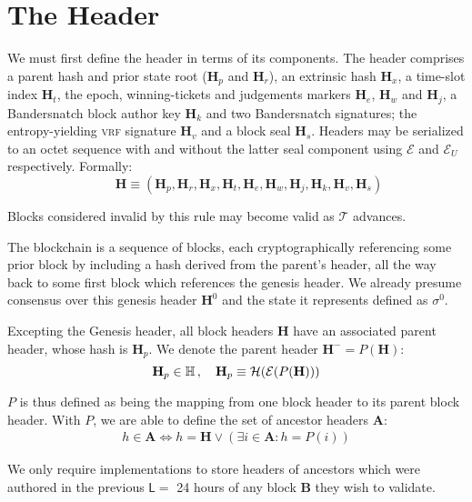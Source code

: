 \section{The Header}\label{sec:header}

We must first define the header in terms of its components. The header comprises a parent hash and prior state root ($\mathbf{H}_p$ and $\mathbf{H}_r$), an extrinsic hash $\mathbf{H}_x$, a time-slot index $\mathbf{H}_t$, the epoch, winning-tickets and judgements markers $\mathbf{H}_e$, $\mathbf{H}_w$ and $\mathbf{H}_j$, a Bandersnatch block author key $\mathbf{H}_k$ and two Bandersnatch signatures; the entropy-yielding \textsc{vrf} signature $\mathbf{H}_v$ and a block seal $\mathbf{H}_s$. Headers may be serialized to an octet sequence with and without the latter seal component using $\mathcal{E}$ and $\mathcal{E}_U$ respectively. Formally:
\begin{equation}\label{eq:header}
  \qquad\mathbf{H} \equiv (\mathbf{H}_p, \mathbf{H}_r, \mathbf{H}_x, \mathbf{H}_t, \mathbf{H}_e, \mathbf{H}_w, \mathbf{H}_j, \mathbf{H}_k, \mathbf{H}_v, \mathbf{H}_s)
\end{equation}

Blocks considered invalid by this rule may become valid as $\mathcal{T}$ advances.

The blockchain is a sequence of blocks, each cryptographically referencing some prior block by including a hash derived from the parent's header, all the way back to some first block which references the genesis header. We already presume consensus over this genesis header $\mathbf{H}^0$ and the state it represents defined as $\sigma^0$.

Excepting the Genesis header, all block headers $\mathbf{H}$ have an associated parent header, whose hash is $\mathbf{H}_p$. We denote the parent header $\mathbf{H}^- = P(\mathbf{H})$:
\begin{equation}
  \mathbf{H}_p \in \mathbb{H} \,,\quad \mathbf{H}_p \equiv \mathcal{H}(\mathcal{E}(P(\mathbf{H})))
\end{equation}

$P$ is thus defined as being the mapping from one block header to its parent block header. With $P$, we are able to define the set of ancestor headers $\mathbf{A}$:
\begin{align}\label{eq:ancestors}
  h \in \mathbf{A} \Leftrightarrow h = \mathbf{H} \vee (\exists i \in \mathbf{A} : h = P(i))
\end{align}

We only require implementations to store headers of ancestors which were authored in the previous $\mathsf{L} = $ 24 hours of any block $\mathbf{B}$ they wish to validate.

